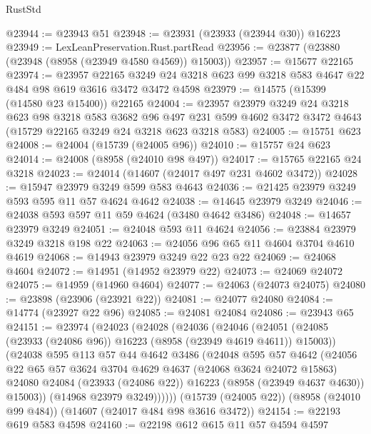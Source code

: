 \begin{lexlean}{RustStd}
\begin{coremodule}
@23944 := @23943 @51
@23948 := @23931 (@23933 (@23944 @30)) @16223
@23949 := LexLeanPreservation.Rust.partRead
@23956 := @23877 (@23880 (@23948 (@8958 (@23949 @4580 @4569)) @15003))
@23957 := @15677 @22165
@23974 := @23957
    @22165
    @3249
    @24
    @3218
    @623
    @99
    @3218
    @583
    @4647
    @22
    @484
    @98
    @619
    @3616
    @3472
    @3472
    @4598
@23979 := @14575 (@15399 (@14580 @23 @15400)) @22165
@24004 := @23957
    @23979
    @3249
    @24
    @3218
    @623
    @98
    @3218
    @583
    @3682
    @96
    @497
    @231
    @599
    @4602
    @3472
    @3472
    @4643
    (@15729 @22165 @3249 @24 @3218 @623 @3218 @583)
@24005 := @15751 @623
@24008 := @24004 (@15739 (@24005 @96))
@24010 := @15757 @24 @623
@24014 := @24008 (@8958 (@24010 @98 @497))
@24017 := @15765 @22165 @24 @3218
@24023 := @24014 (@14607 (@24017 @497 @231 @4602 @3472))
@24028 := @15947 @23979 @3249 @599 @583 @4643
@24036 := @21425 @23979 @3249 @593 @595 @11 @57 @4624 @4642
@24038 := @14645 @23979 @3249
@24046 := @24038 @593 @597 @11 @59 @4624 (@3480 @4642 @3486)
@24048 := @14657 @23979 @3249
@24051 := @24048 @593 @11 @4624
@24056 := @23884 @23979 @3249 @3218 @198 @22
@24063 := @24056 @96 @65 @11 @4604 @3704 @4610 @4619
@24068 := @14943 @23979 @3249 @22 @23 @22
@24069 := @24068 @4604
@24072 := @14951 (@14952 @23979 @22)
@24073 := @24069 @24072
@24075 := @14959 (@14960 @4604)
@24077 := @24063 (@24073 @24075)
@24080 := @23898 (@23906 (@23921 @22))
@24081 := @24077 @24080
@24084 := @14774 (@23927 @22 @96)
@24085 := @24081 @24084
@24086 := @23943 @65
@24151 := @23974
    (@24023
      (@24028
        (@24036
          (@24046
            (@24051 (@24085 (@23933 (@24086 @96)) @16223 (@8958 (@23949 @4619 @4611)) @15003))
            (@24038
              @595
              @113
              @57
              @44
              @4642
              @3486
              (@24048
                @595
                @57
                @4642
                (@24056
                  @22
                  @65
                  @57
                  @3624
                  @3704
                  @4629
                  @4637
                  (@24068 @3624 @24072 @15863)
                  @24080
                  @24084
                  (@23933 (@24086 @22))
                  @16223
                  (@8958 (@23949 @4637 @4630))
                  @15003))
              (@14968 @23979 @3249))))))
    (@15739 (@24005 @22))
    (@8958 (@24010 @99 @484))
    (@14607 (@24017 @484 @98 @3616 @3472))
@24154 := @22193 @619 @583 @4598
@24160 := @22198 @612 @615 @11 @57 @4594 @4597

\end{coremodule}
\end{lexlean}
